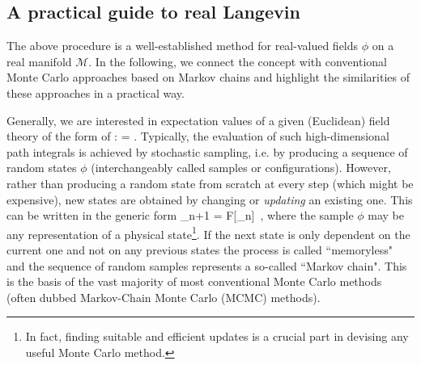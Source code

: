 \documentclass[../main.tex]{subfiles}
\begin{document}
\subsection{A practical guide to real Langevin}
The above procedure is a well-established method for real-valued fields $\phi$ on a real manifold $\mathcal{M}$. In the following, we connect the concept with conventional Monte Carlo approaches based on Markov chains and highlight the similarities of these approaches in a practical way.

Generally, we are interested in expectation values of a given (Euclidean) field theory of the form of :
%
\beq
  \langle \CO \rangle =  \equiv {}.
  \label{Eq:langevin_toy_expectation}
\eeq
%
Typically, the evaluation of such high-dimensional path integrals is achieved by stochastic sampling, i.e. by producing a sequence of random states $\phi$ (interchangeably called samples or configurations). However, rather than producing a random state from scratch at every step (which might be expensive), new states are obtained by changing or {\it updating} an existing one. This can be written in the generic form
\beq
  \label{Eq:markov_chain}
  \phi_{n+1} = F[\phi_n]\, ,
\eeq
where the sample $\phi$ may be any representation of a physical state\footnote{In fact, finding suitable and efficient updates is a crucial part in devising any useful Monte Carlo method.}. If the next state is only dependent on the current one and not on any previous states the process is called ``memoryless" and the sequence of random samples represents a so-called ``Markov chain". This is the basis of the vast majority of most conventional Monte Carlo methods (often dubbed Markov-Chain Monte Carlo (MCMC) methods).
\end{document}
